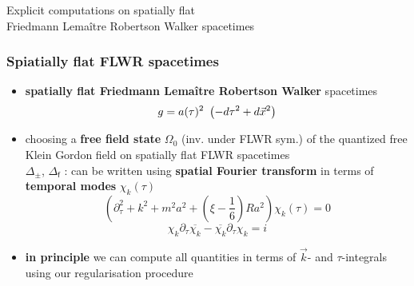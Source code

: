 \documentclass[9pt]{beamer}
\newcommand{\fsf}{\mathsf{f}}
\begin{document}
{
\begin{frame}
\bf
\begin{exampleblock}{\vspace*{-3ex}}
\begin{center}
\Large Explicit computations on spatially flat \\[10pt] Friedmann Lemaître Robertson Walker spacetimes
\end{center}
\end{exampleblock}
\end{frame}
}


\begin{frame}
 
\frametitle{Spiatially flat FLWR spacetimes} 

\begin{itemize}
 
\item \textbf{spatially flat Friedmann Lemaître Robertson Walker} spacetimes
\vspace*{-12pt}
\begin{equation*}
g = a(\tau)^2 \ \left( - d\tau^2 + d\vec{x}^2 \right) 
\vspace*{-8pt}
\end{equation*}

\item choosing a \textbf{free field state} $\Omega_0$ (inv. under FLWR sym.) of the quantized free Klein Gordon field on spatially flat FLWR spacetimes \\
$\Delta_\pm$, $\Delta_\fsf$ : can be written using \textbf{spatial Fourier transform} in terms of \textbf{temporal modes} $\chi_k(\tau)$
\vspace*{-6pt}
\begin{equation*}
\left( \partial^2_\tau + k^2 + m^2a^2 + \left( \xi - \frac16 \right)Ra^2 \right) \chi_k(\tau) = 0 
\end{equation*}
\begin{equation*}
\chi_k \partial_\tau \overline{\chi_k} - \overline{\chi_k} \partial_\tau {\chi_k} =i 
\end{equation*}

\item \textbf{in principle} we can compute all quantities in terms of $\vec{k}$- and $\tau$-integrals using our regularisation procedure 
  
\end{itemize}
 
\end{frame}
\end{document}

